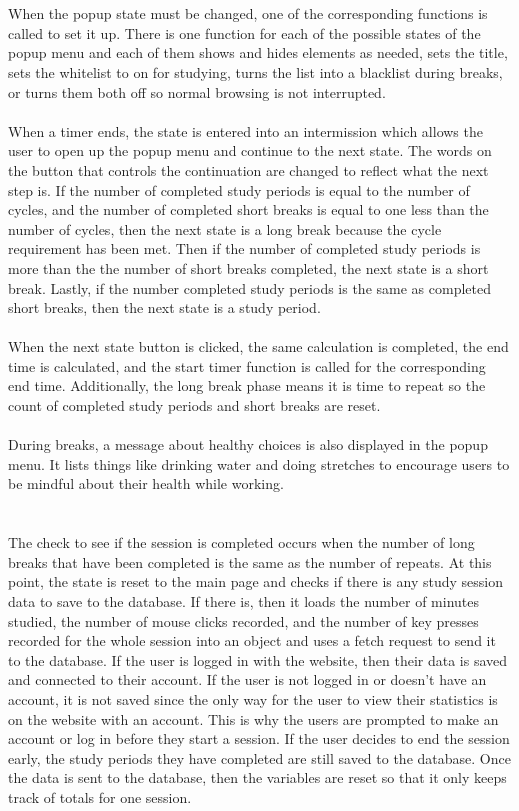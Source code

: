 \documentclass[12pt]{article}
\begin{document}
\\\\
When the popup state must be changed, one of the corresponding functions is called to set it up. There is one function for each of the possible states of the popup 
menu and each of them shows and hides elements as needed, sets the title, sets the whitelist to on for studying, turns the list into a blacklist during breaks, or turns 
them both off so normal browsing is not interrupted.
\\\\
\indent When a timer ends, the state is entered into an intermission which allows the user to open up the popup menu and continue to the next state. The words on the button that controls the continuation 
are changed to reflect what the next step is. If the number of completed study periods is equal to the number of cycles, and the number of completed short breaks 
is equal to one less than the number of cycles, then the next state is a long break because the cycle requirement has been met. 
Then if the number of completed study periods is more than the the number of short breaks completed, the next state is a short break. 
Lastly, if the number completed study periods is the same as completed short breaks, then the next state is a study period.
\\\\\indent When the next state button is clicked, the same calculation is completed, the end time is calculated, and the start timer function is called for the corresponding end time. 
Additionally, the long break phase means it is time to repeat so the count of completed study periods and short breaks are reset.
\\\\\indent During breaks, a message about healthy choices is also displayed in the popup menu. It lists things like drinking water and doing stretches to encourage users to be mindful about their health while working. \\

\\\\The check to see if the session is completed occurs when the number of long breaks that have been completed is the same as the number of repeats. 
At this point, the state is reset to the main page and checks if there is any study session data to save to the database. If there is, then it loads the number of minutes studied, 
the number of mouse clicks recorded, and the number of key presses recorded for the whole session into an object and uses a fetch request to send it to the database. If the user is logged in with 
the website, then their data is saved and connected to their account. If the user is not logged in or doesn't have an account, it is not saved since the only way for the user to view their statistics 
is on the website with an account. This is why the users are prompted to make an account or log in before they start a session. 
If the user decides to end the session early, the study periods they have completed are still saved to the database.
Once the data is sent to the database, then the variables are reset so that it only keeps track of totals for one session.
\end{document}

